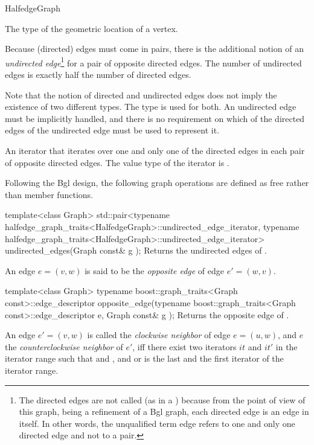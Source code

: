 \begin{ccRefConcept}{HalfedgeGraph}


{The type of the geometric location of a vertex.}


Because (directed) edges must come in pairs, there is the additional
notion of an {\em undirected edge}\footnote{
The directed edges are not called  (as in a
) because from the point of view of this graph, being
a refinement of a {\sc Bgl} graph, each directed edge is an
edge in itself. In other words, the unqualified term edge
refers to one and only one directed edge and not to a pair.}
% 
for a pair of opposite directed edges.
The number of undirected edges is exactly half the number of directed edges.

 
Note that the notion of directed and undirected edges does not imply
the existence of two different types.  The type 
is used for both.  An undirected edge must be implicitly handled, and
there is no requirement on which of the directed edges of the undirected edge
must be used to represent it.



  {An iterator that iterates over one and only one of the directed edges
  in each pair of opposite directed edges. The value type of the iterator 
  is .}{}



Following the {\sc Bgl} design, the following graph operations are defined as free 
rather than member functions.

  \ccFunction
  {template<class Graph>
  std::pair<typename halfedge_graph_traits<HalfedgeGraph>::undirected_edge_iterator,
            typename halfedge_graph_traits<HalfedgeGraph>::undirected_edge_iterator>
  undirected_edges(Graph const& g );
  }
  {Returns the undirected edges of .}


An edge $e=(v,w)$ is said to be the {\em opposite edge} of edge $e'=(w,v)$.

  \ccFunction
  {template<class Graph>
  typename boost::graph_traits<Graph const>::edge_descriptor 
  opposite_edge(typename boost::graph_traits<Graph const>::edge_descriptor e, Graph const& g );
  }
  {Returns the opposite edge of .}
  
An edge $e'=(v,w)$ is called the {\em clockwise neighbor} of edge
$e=(u,w)$, and $e$ the {\em counterclockwise neighbor} of $e'$, iff there
exist two iterators $it$ and $it'$ in the iterator range
 such that  and ,
and  or  is the last and  the first
iterator of the iterator range.
 


\end{ccRefConcept}
